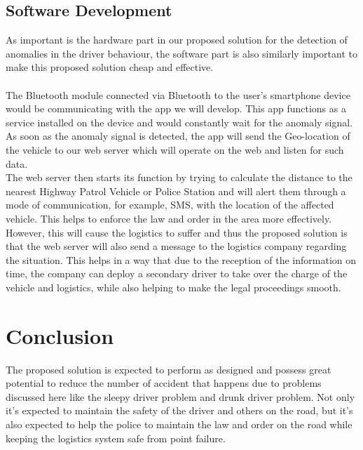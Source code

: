 \documentclass{article}
\begin{document}
\subsection{Software Development}
As important is the hardware part in our proposed solution for the detection of anomalies in the driver behaviour, the software part is also similarly important to make this proposed solution cheap and effective. \\ \\ 
The Bluetooth module connected via Bluetooth to the user's smartphone device would be communicating with the app we will develop. This app functions as a service installed on the device and would constantly wait for the anomaly signal. As soon as the anomaly signal is detected, the app will send the Geo-location of the vehicle to our web server which will operate on the web and listen for such data. \\

The web server then starts its function by trying to calculate the distance to the nearest Highway Patrol Vehicle or Police Station and will alert them through a mode of communication, for example, SMS, with the location of the affected vehicle. This helps to enforce the law and order in the area more effectively. \\

However, this will cause the logistics to suffer and thus the proposed solution is that the web server will also send a message to the logistics company regarding the situation. This helps in a way that due to the reception of the information on time, the company can deploy a secondary driver to take over the charge of the vehicle and logistics, while also helping to make the legal proceedings smooth. 


\section{Conclusion}
The proposed solution is expected to perform as designed and possess great potential to reduce the number of accident that happens due to problems discussed here like the sleepy driver problem and drunk driver problem. Not only it's expected to maintain the safety of the driver and others on the road, but it's also expected to help the police to maintain the law and order on the road while keeping the logistics system safe from point failure. 


\end{document}
